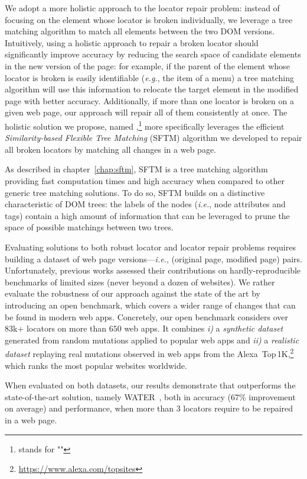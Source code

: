 We adopt a more holistic approach to the locator repair problem: instead of focusing on the element whose locator is broken individually, we leverage a tree matching algorithm to match all elements between the two DOM versions. 
Intuitively, using a holistic approach to repair a broken locator should significantly improve accuracy by reducing the search space of candidate elements in the new version of the page: for example, if the parent of the element whose locator is broken is easily identifiable (\emph{e.g.}, the item of a menu) a tree matching algorithm will use this information to relocate the target element in the modified page with better accuracy.
Additionally, if more than one locator is broken on a given web page, our approach will repair all of them consistently at once.
The holistic solution we propose, named \erratum{},\footnote{\erratum{} stands for "\erratumlong{}"} more specifically leverages the efficient \emph{Similarity-based Flexible Tree Matching} (SFTM) algorithm we developed to repair all broken locators by matching all changes in a web page.

As described in chapter~\ref{chap:sftm}, SFTM is a tree matching algorithm providing fast computation times and high accuracy when compared to other generic tree matching solutions.
To do so, SFTM builds on a distinctive characteristic of DOM trees: the labels of the nodes (\emph{i.e.}, node attributes and tags) contain a high amount of information that can be leveraged to prune the space of possible matchings between two trees.

Evaluating solutions to both robust locator and locator repair problems requires building a dataset of web page versions---\emph{i.e.}, \textsf{(original page, modified page)} pairs.
Unfortunately, previous works assessed their contributions on hardly-reproducible benchmarks of limited sizes (never beyond a dozen of websites).
We rather evaluate the robustness of our approach against the state of the art by introducing an open benchmark, which covers a wider range of changes that can be found in modern web apps.
Concretely, our open benchmark considers over 83k+ locators on more than $650$ web apps.
It combines \emph{i)} a \emph{synthetic dataset} generated from random mutations applied to popular web apps and \emph{ii)} a \emph{realistic dataset} replaying real mutations observed in web apps from the Alexa~Top\,1K,\footnote{\url{https://www.alexa.com/topsites}} which ranks the most popular websites worldwide.

When evaluated on both datasets, our results demonstrate that \erratum{} outperforms the state-of-the-art solution, namely WATER~\cite{choudhary2011water}, both in accuracy (67\% improvement on average) and performance, when more than 3 locators require to be repaired in a web page.

